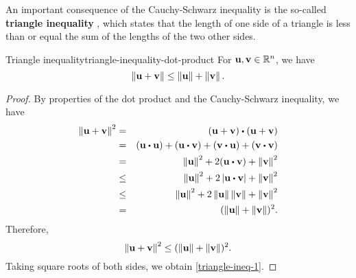 An important consequence of the Cauchy-Schwarz inequality is the
so-called \textbf{triangle inequality}%
, which states that the length
of one side of a triangle is less than or equal the sum of the lengths
of the two other sides.

\begin{proposition}{Triangle inequality}{triangle-inequality-dot-product}
  For\/ $\vect{u},\vect{v}\in \R^n$, we have
  \begin{equation}\label{triangle-ineq-1}
    \norm{\vect{u}+\vect{v}} \leq \norm{\vect{u}} +\norm{\vect{v}}.
  \end{equation}

  \begin{center}
  \end{center}
\end{proposition}

\begin{proof}
  By properties of the dot product and the Cauchy-Schwarz inequality,
  we have
  \begin{eqnarray*}
    \norm{\vect{u}+\vect{v}}^2
    &=& (\vect{u}+\vect{v})\dotprod(\vect{u}+\vect{v}) \\
    & =&(\vect{u}\dotprod\vect{u})+(\vect{u}\dotprod\vect{v})+(\vect{v}\dotprod\vect{u})+(\vect{v}\dotprod\vect{v}) \\
    &=&\norm{\vect{u}}^2+2(\vect{u}\dotprod\vect{v})+\norm{\vect{v}}^2 \\
    &\leq& \norm{\vect{u}}^2+2\abs{\vect{u}\dotprod\vect{v}}+\norm{\vect{v}}^2 \\
    &\leq& \norm{\vect{u}}^2+2\norm{\vect{u}}\norm{\vect{v}}+\norm{\vect{v}}^2 \\
    &=& (\norm{\vect{u}}+\norm{\vect{v}})^2.
  \end{eqnarray*}
  Therefore,
  \begin{equation*}
    \norm{\vect{u}+\vect{v}}^2\leq(\norm{\vect{u}}+\norm{\vect{v}})^2.
  \end{equation*}
  Taking square roots of both sides, we obtain \eqref{triangle-ineq-1}.
\end{proof}

